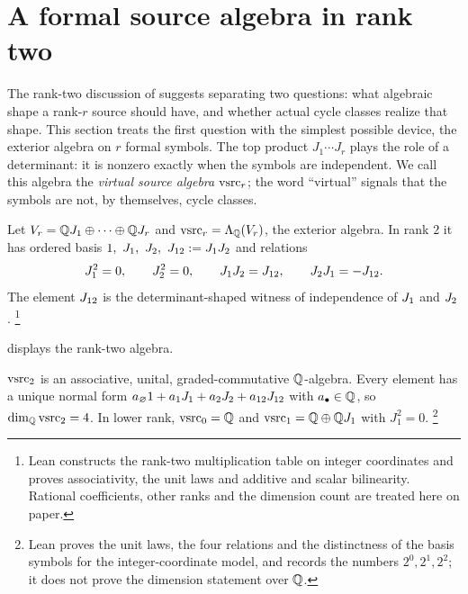\section{A formal source algebra in rank two}
\label{sec:vsrc}

The rank-two discussion of  suggests separating
two questions: what algebraic shape a rank-$r$ source should have, and
whether actual cycle classes realize that shape.  This section treats the
first question with the simplest possible device, the exterior algebra on
$r$ formal symbols.  The top product $J_1\cdots J_r$ plays the role of a
determinant: it is nonzero exactly when the symbols are independent.  We
call this algebra the \emph{virtual source algebra} $\mathrm{vsrc}_r$; the word
``virtual'' signals that the symbols are not, by themselves, cycle classes.

\begin{definition}\label{def:apparatus:vsrc-algebra}
Let $V_r=\mathbb{Q} J_1\oplus\cdots\oplus\mathbb{Q} J_r$ and $\mathrm{vsrc}_r=\Lambda_{\mathbb{Q}}(V_r)$,
the exterior algebra.  In rank $2$ it has ordered basis
$1,\ \Jone,\ \Jtwo,\ \Jtwelve:=\Jone\Jtwo$ and relations
\[
  J_1^2=0,\qquad J_2^2=0,\qquad
  J_1J_2=J_{12},\qquad
  J_2J_1=-J_{12}.
\]
The element $J_{12}$ is the determinant-shaped witness of independence
of $J_1$ and $J_2$.%
\footnote{Lean constructs the rank-two multiplication table on integer
coordinates and proves associativity, the unit laws and additive and
scalar bilinearity.  Rational coefficients, other ranks and the dimension
count are treated here on paper.}
\end{definition}

 displays the rank-two algebra.



\begin{theorem}\label{thm:apparatus:vsrc-stage-i-consistency}
$\mathrm{vsrc}_2$ is an associative, unital, graded-commutative $\mathbb{Q}$-algebra.
Every element has a unique normal form
$a_{\varnothing}1+a_1J_1+a_2J_2+a_{12}J_{12}$ with $a_\bullet\in\mathbb{Q}$,
so $\dim_{\mathbb{Q}}\mathrm{vsrc}_2=4$.  In lower rank, $\mathrm{vsrc}_0=\mathbb{Q}$ and
$\mathrm{vsrc}_1=\mathbb{Q}\oplus\mathbb{Q} J_1$ with $J_1^2=0$.%
\footnote{Lean proves the unit laws, the four relations and the
distinctness of the basis symbols for the integer-coordinate model, and
records the numbers $2^0,2^1,2^2$; it does not prove the dimension
statement over $\mathbb{Q}$.}
\end{theorem}

